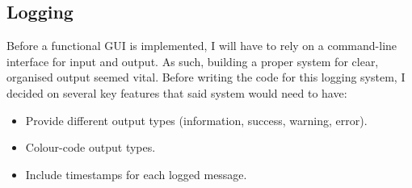\subsection{Logging}
    Before a functional GUI is implemented, I will have to rely on a command-line interface for input and output. As such, building a proper system for clear, organised output seemed vital. Before writing the code for this logging system, I decided on several key features that said system would need to have:
    \begin{itemize}
        \item Provide different output types (information, success, warning, error).
        \item Colour-code output types.
        \item Include timestamps for each logged message.
    \end{itemize}

    \inputminted{c++}{code/logging.hpp}

    \inputminted{C++}{code/logging.cpp}
